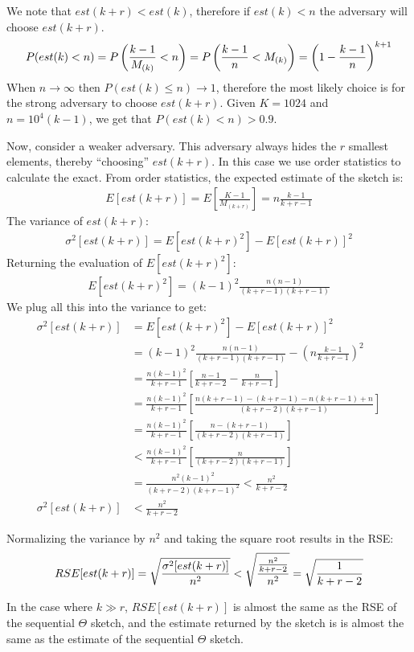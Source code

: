 We note that $est(k+r)<est(k)$, therefore if $est(k)<n$ the adversary will choose $est(k+r)$.
\begin{align*}
    P(est(k)<n)=P\left({k-1 \over M_{(k)}}<n\right)=P\left({k-1 \over n}<M_{(k)}\right)=\left(1-\frac{k-1}{n}\right)^{k+1}
\end{align*}
When $n\rightarrow\infty$ then $P(est(k) \leq n) \rightarrow 1$, therefore the most likely choice is for the strong
adversary to choose $est(k+r)$. Given $K=1024$ and $n=10^4(k-1)$, we get that $P(est(k)<n) > 0.9$.

Now, consider a weaker adversary. This adversary always hides the $r$ smallest elements, 
thereby ``choosing'' $est(k+r)$. In this case we use order statistics to calculate the exact.
From order statistics, the expected estimate of the sketch is:
\begin{align*}
    E[est(k+r)]=E\left[ \frac{K-1}{M_{(k+r)}} \right]=n\frac{k-1}{k+r-1}   
\end{align*}
The variance of $est(k+r)$:
\begin{align*}
    \sigma^2[est(k+r)] = E[est(k+r)^2] - E[est(k+r)]^2
\end{align*}
Returning the evaluation of $E[est(k+r)^2]$:
\begin{align*}
    E[est(k+r)^2]=(k-1)^2\frac{n(n-1)}{(k+r-1)(k+r-1)}
\end{align*}
We plug all this into the variance to get:
\begin{align*}
    \sigma^2[est(k+r)] &= E[est(k+r)^2] - E[est(k+r)]^2 \\
    &=(k-1)^2\frac{n(n-1)}{(k+r-1)(k+r-1)} - \left(n\frac{k-1}{k+r-1} \right)^2 \\
    &=\frac{n(k-1)^2}{k+r-1}\left[\frac{n-1}{k+r-2}-\frac{n}{k+r-1}\right] \\
    &=\frac{n(k-1)^2}{k+r-1}\left[\frac{n(k+r-1)-(k+r-1)-n(k+r-1)+n}{(k+r-2)(k+r-1)}\right] \\
    &=\frac{n(k-1)^2}{k+r-1}\left[\frac{n-(k+r-1)}{(k+r-2)(k+r-1)}\right] \\
    &< \frac{n(k-1)^2}{k+r-1}\left[\frac{n}{(k+r-2)(k+r-1)}\right] \\
    &=\frac{n^2(k-1)^2}{(k+r-2)(k+r-1)^2} < \frac{n^2}{k+r-2} \\
    \sigma^2[est(k+r)] &< \frac{n^2}{k+r-2}
\end{align*}

Normalizing the variance by $n^2$ and taking the square root results in the RSE:
\begin{align*} 
    RSE[est(k+r)]=\sqrt{{\sigma^2[est(k+r)]\over n^2}}<\sqrt{{\frac{n^2}{k+r-2} \over n^2}}=\sqrt{\frac{1}{k+r-2}}
\end{align*}

In the case where $k \gg r$, $RSE[est(k+r)]$ is almost the same as the RSE of the sequential $\Theta$ sketch,
and the estimate returned by the sketch is is almost the same as the estimate of the sequential $\Theta$ sketch.